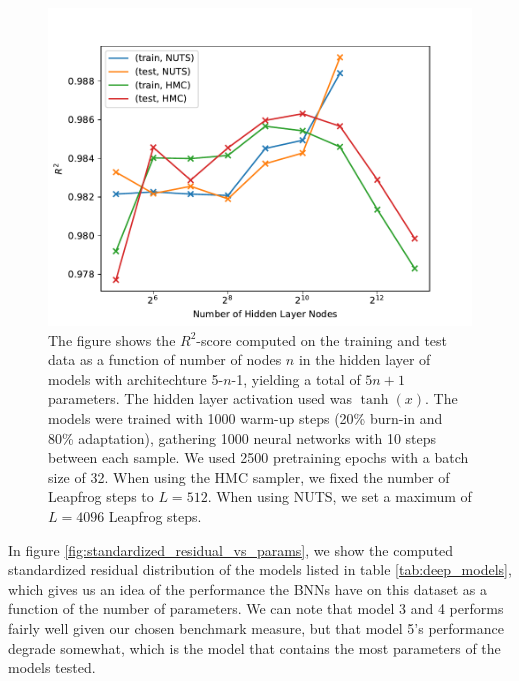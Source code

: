 \begin{figure}[h!]
    \centering
    \includegraphics[scale=0.7]{figures/r2_scores/r2_score_vs_num_params_log_space.pdf}
    \caption{
        The figure shows the $R^2$-score computed on the training and test data as a function of number of nodes $n$ in the hidden layer of models with architechture 5-$n$-1, yielding a total of $5n + 1$ parameters. The hidden layer activation used was $\tanh(x)$.
        The models were trained with 1000 warm-up steps (20\% burn-in and 80\% adaptation), gathering 1000 neural networks with 10 steps between each sample. We used 2500 pretraining epochs with a batch size of 32. 
        When using the HMC sampler, we fixed the number of Leapfrog steps to $L = 512$. When using NUTS, we set a maximum of $L = 4096$ Leapfrog steps. 
    }\label{fig:r2_scores_vs_num_params}
\end{figure}



In figure \ref{fig:standardized_residual_vs_params}, we show the computed standardized residual distribution of the models listed in table \ref{tab:deep_models}, which gives us an idea of the performance the BNNs have on this dataset as a function of the number of parameters. We can note that model 3 and 4 performs fairly well given our chosen benchmark measure, but that model 5's performance degrade somewhat, which is the model that contains the most parameters of the models tested. 

